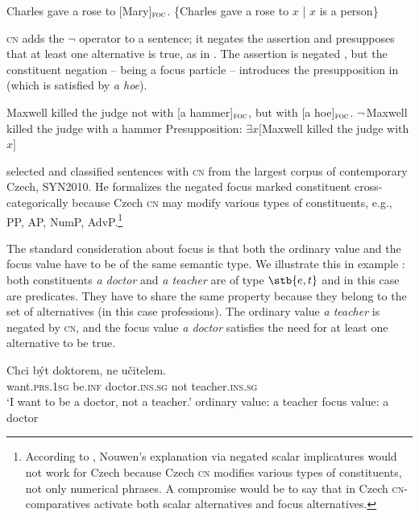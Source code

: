 \documentclass[output=paper,
]{langscibook}
\begin{document}
\ea \ea Charles gave a rose to [Mary]$_{\textsc{foc}}$. 
	\ex \{Charles gave a rose to $x$ | $x$ is a person\}
    \label{ex:set}
\z
\z


\noindent \textsc{cn} adds the $\neg$ operator to a sentence; it negates the assertion and presupposes that at least one alternative is true, as in . The assertion is negated , but the constituent negation -- being a focus particle -- introduces the presupposition in  (which is satisfied by \textit{a hoe}).

\ea  Maxwell killed the judge not with [a hammer]$_{\textsc{foc}}$, but with [a hoe]$_{\textsc{foc}}$. \label{ex:hammer} \ea $\neg\,$Maxwell killed the judge with a hammer \label{ex:negham}
\ex Presupposition: $\exists x[$Maxwell killed the judge with $x]$ \label{ex:presham}
\z
\z

\noindent \cite{dovcekal2017upper} selected and classified sentences with \textsc{cn} from the largest corpus of contemporary Czech, SYN2010. He formalizes the negated focus marked constituent cross-categorically because Czech \textsc{cn} may modify various types of constituents, e.g., PP, AP, NumP, AdvP.\footnote{\label{footn:expl}According to \cite{dovcekal2017upper}, Nouwen's explanation via negated scalar implicatures would not work for Czech because Czech \textsc{cn} modifies various types of constituents, not only numerical phrases. A compromise would be to say that in Czech \textsc{cn-}comparatives activate both scalar alternatives and focus alternatives.} 

The standard consideration about focus is that both the ordinary value and the focus value have to be of the same semantic type. We illustrate this in example : both constituents \textit{a doctor} and \textit{a teacher} are of type $\stb{e,t}$ and in this case are predicates. They have to share the same property because they belong to the set of alternatives (in this case professions). The ordinary value \textit{a teacher} is negated by \textsc{cn}, and the focus value \textit{a doctor} satisfies the need for at least one alternative to be true. 

\ea \label{ex:doktor} \gll Chci být doktorem, ne učitelem.\\
want.\textsc{prs.1sg} be.\textsc{inf} doctor.\textsc{ins.sg} not teacher.\textsc{ins.sg}\\
	\glt `I want to be a doctor, not a teacher.'
    \ea ordinary value: a teacher
    \ex focus value: a doctor
\z
\z
\end{document}
